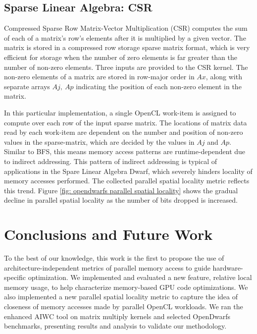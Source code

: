 \documentclass[review=false, sigchi]{acmart}
\begin{document}
	\subsection{Sparse Linear Algebra: CSR}
	
	Compressed Sparse Row Matrix-Vector Multiplication (CSR) computes the sum of each of a matrix's row's elements after it is multiplied by a given vector. The matrix is stored in a compressed row storage sparse matrix format, which is very efficient for storage when the number of zero elements is far greater than the number of non-zero elements. Three inputs are provided to the CSR kernel. The non-zero elements of a matrix are stored in row-major order in $Ax$, along with separate arrays $Aj,\ Ap$ indicating the position of each non-zero element in the matrix.
	
	In this particular implementation, a single OpenCL work-item is assigned to compute over each row of the input sparse matrix. 
	The locations of matrix data read by each work-item are dependent on the number and position of non-zero values in the sparse-matrix, which are decided by the values in $Aj$ and $Ap$. 
	Similar to BFS, this means memory access patterns are runtime-dependent due to indirect addressing.
	This pattern of indirect addressing is typical of applications in the Spare Linear Algebra Dwarf, which severely hinders locality of memory accesses performed. The collected parallel spatial locality metric reflects this trend. Figure \ref{fig: opendwarfs parallel spatial locality} shows the gradual decline in parallel spatial locality as the number of bits dropped is increased.
	
	\section{Conclusions and Future Work} \label{future work}
	
	To the best of our knowledge, this work is the first to propose the use of architecture-independent metrics of parallel memory access to guide hardware-specific optimization. 
	We implemented and evaluated a new feature, relative local memory usage, to help characterize memory-based GPU code optimizations.
	We also implemented a new parallel spatial locality metric to capture the idea of closeness of memory accesses made by parallel OpenCL workloads.
	We ran the enhanced AIWC tool on matrix multiply kernels and selected OpenDwarfs benchmarks, presenting results and analysis to validate our methodology. 
	
\end{document}
